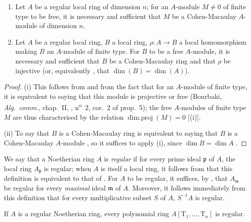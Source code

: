 
\begin{corollary}[17.3.5]
\label{0.17.3.5}
\begin{enumerate}
  \item[{\rm(i)}] Let $A$ be a regular local ring of dimension $n$; for an $A$-module $M\neq 0$ of finite type to be free, it is necessary and sufficient that $M$ be a Cohen-Macaulay $A$-module of dimension $n$.
  \item[{\rm(ii)}] Let $A$ be a regular local ring, $B$ a local ring, $\rho:A\to B$ a local homomorphism making $B$ an $A$-module of finite type.
  For $B$ to be a free $A$-module, it is necessary and sufficient that $B$ be a Cohen-Macaulay ring and that $\rho$ be injective (or, equivalently , that $\dim(B)=\dim(A)$).
\end{enumerate}
\end{corollary}

\begin{proof}
(i) This follows from  and from the fact that for an $A$-module of finite type, it is equivalent to saying that this module is projective or free (Bourbaki, \emph{Alg.~comm.}, chap.~II, , n\textsuperscript{o}~2, cor.~2 of prop.~5);
the free $A$-modules of finite type $M$ are thus characterised by the relation $\operatorname{dim.proj}(M)=0$ [(i)].

(ii) To say that $B$ is a Cohen-Macaulay ring is equivalent to saying that $B$ is a Cohen-Macaulay $A$-module , so it suffices to apply (i), since $\dim B=\dim A$ .
\end{proof}

\begin{env}[17.3.6]
\label{0.17.3.6}
We say that a Noetherian ring $A$ is \emph{regular} if for every prime ideal $\mathfrak{p}$ of $A$, the local ring $A_\mathfrak{p}$ is regular;
when $A$ is itself a local ring, it follows from  that this definition is equivalent to that of .
For $A$ to be regular, it suffices, by , that $A_\mathfrak{m}$ be regular for every \emph{maximal} ideal $\mathfrak{m}$ of $A$.
Moreover, it follows immediately from this definition that for every multiplicative subset $S$ of $A$, $S^{-1}A$ is regular.
\end{env}

\begin{proposition}[17.3.7]
\label{0.17.3.7}
If $A$ is a regular Noetherian ring, every polynomial ring $A[\mathrm{T}_1,\ldots,\mathrm{T}_n]$ is regular.
\end{proposition}

